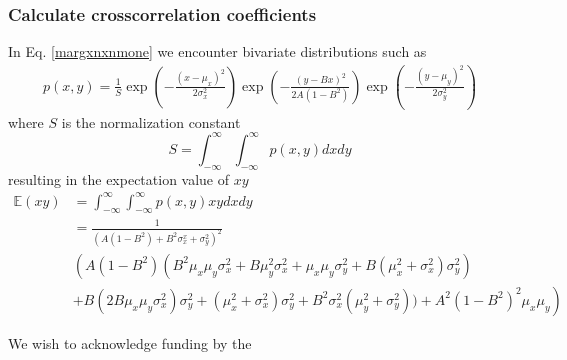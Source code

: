 \documentclass[%
 reprint,
 amsmath,amssymb,
 aps,
]{revtex4-1}
\begin{document}
\subsubsection{Calculate crosscorrelation coefficients}
In Eq. \ref{margxnxnmone} we encounter bivariate distributions such as
\begin{equation}
	\begin{aligned}
	p(x,y)=\frac{1}{S}
	\exp \left( -\frac{{{{\left( {x - \mu_{x}} \right)}^2}}}{{2\sigma_{x}^{2}}} \right)
	\exp \left( -\frac{{{{\left( {y - Bx} \right)}^2}}}{{2A(1-B^{2})}} \right)
	\exp \left( -\frac{{{{\left( {y - \mu_{y}} \right)}^2}}}{{2\sigma_{y}^{2}}} \right)
	\end{aligned}
\end{equation}
where $S$ is the normalization constant
\begin{equation}
	S = \int_{-\infty}^{\infty}\int_{-\infty}^{\infty}p(x,y)dxdy
\end{equation}
resulting in the expectation value of $xy$
\begin{equation}
	\begin{aligned}
	\mathbb{E}(xy) &= \int_{-\infty}^{\infty}\int_{-\infty}^{\infty}p(x,y)xydxdy\\
	&=	\frac{1}{(A(1-B^{2})+B^{2}\sigma^{x}_{x}+\sigma^{2}_{y})^{2}}\\
&\left( A(1-B^{2})(B^{2}\mu_{x}\mu_{y}\sigma_{x}^{2}+B\mu_{y}^{2}\sigma_{x}^{2}+\mu_{x}\mu_{y}\sigma_{y}^{2}+B(\mu_{x}^{2}+\sigma_{x}^{2})\sigma_{y}^{2})\right.\\
	&\left.+B(2B\mu_{x}\mu_{y}\sigma_{x}^{2})\sigma_{y}^{2}+(\mu_{x}^{2}+\sigma_{x}^{2})\sigma_{y}^{2}+B^{2}\sigma_{x}^{2}(\mu_{y}^2+\sigma_{y}^{2}))
	+A^{2}(1-B^{2})^{2}\mu_{x}\mu_{y} \right)
	\end{aligned}
\end{equation}
\begin{acknowledgments}
We wish to acknowledge funding by the 
\end{acknowledgments}
\end{document}
